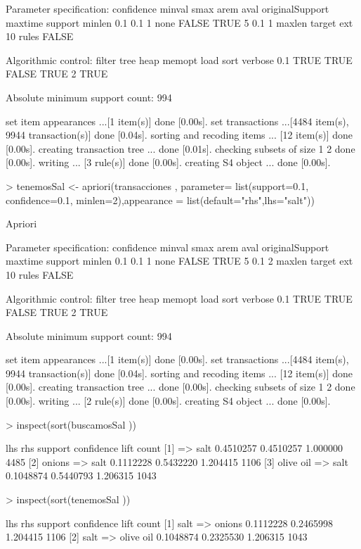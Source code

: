 \documentclass [a4paper] {article}
\begin{document}
\begin{Schunk}
\begin{Soutput}
Parameter specification:
 confidence minval smax arem  aval originalSupport maxtime support minlen
        0.1    0.1    1 none FALSE            TRUE       5     0.1      1
 maxlen target   ext
     10  rules FALSE

Algorithmic control:
 filter tree heap memopt load sort verbose
    0.1 TRUE TRUE  FALSE TRUE    2    TRUE

Absolute minimum support count: 994 

set item appearances ...[1 item(s)] done [0.00s].
set transactions ...[4484 item(s), 9944 transaction(s)] done [0.04s].
sorting and recoding items ... [12 item(s)] done [0.00s].
creating transaction tree ... done [0.01s].
checking subsets of size 1 2 done [0.00s].
writing ... [3 rule(s)] done [0.00s].
creating S4 object  ... done [0.00s].
\end{Soutput}
\begin{Sinput}
> tenemosSal <- apriori(transacciones , parameter= list(support=0.1, confidence=0.1, minlen=2),appearance = list(default="rhs",lhs="salt"))
\end{Sinput}
\begin{Soutput}
Apriori

Parameter specification:
 confidence minval smax arem  aval originalSupport maxtime support minlen
        0.1    0.1    1 none FALSE            TRUE       5     0.1      2
 maxlen target   ext
     10  rules FALSE

Algorithmic control:
 filter tree heap memopt load sort verbose
    0.1 TRUE TRUE  FALSE TRUE    2    TRUE

Absolute minimum support count: 994 

set item appearances ...[1 item(s)] done [0.00s].
set transactions ...[4484 item(s), 9944 transaction(s)] done [0.04s].
sorting and recoding items ... [12 item(s)] done [0.00s].
creating transaction tree ... done [0.00s].
checking subsets of size 1 2 done [0.00s].
writing ... [2 rule(s)] done [0.00s].
creating S4 object  ... done [0.00s].
\end{Soutput}
\begin{Sinput}
> inspect(sort(buscamosSal ))
\end{Sinput}
\begin{Soutput}
    lhs            rhs    support   confidence lift     count
[1] {}          => {salt} 0.4510257 0.4510257  1.000000 4485 
[2] {onions}    => {salt} 0.1112228 0.5432220  1.204415 1106 
[3] {olive oil} => {salt} 0.1048874 0.5440793  1.206315 1043 
\end{Soutput}
\begin{Sinput}
> inspect(sort(tenemosSal ))
\end{Sinput}
\begin{Soutput}
    lhs       rhs         support   confidence lift     count
[1] {salt} => {onions}    0.1112228 0.2465998  1.204415 1106 
[2] {salt} => {olive oil} 0.1048874 0.2325530  1.206315 1043 
\end{Soutput}
\end{Schunk}
\end{document}

